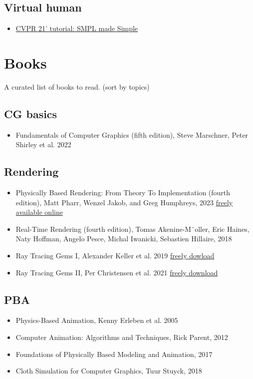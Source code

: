 \documentclass{article}
\begin{document}
\subsection{Virtual human}
\begin{itemize}
    \item \href{https://smpl-made-simple.is.tue.mpg.de/}{CVPR 21' tutorial: SMPL made Simple}
\end{itemize}


\section{Books}
\par A curated list of books to read. (sort by topics)
\subsection{CG basics}
\begin{itemize}
    \item Fundamentals of Computer Graphics (fifth edition), Steve Marschner, Peter Shirley et al. 2022
\end{itemize}
\subsection{Rendering}
\begin{itemize}
    \item Physically Based Rendering: From Theory To Implementation (fourth edition), Matt Pharr, Wenzel Jakob, and Greg Humphreys, 2023 \newline \href{https://pbr-book.org/}{freely available online}
    \item Real-Time Rendering (fourth edition), Tomas Akenine-M¨oller, Eric Haines, Naty Hoffman, Angelo Pesce, Michal Iwanicki, Sebastien Hillaire, 2018
    \item Ray Tracing Gems I, Alexander Keller et al. 2019 \newline \href{https://www.realtimerendering.com/raytracinggems/rtg/index.html}{freely dowload}
    \item Ray Tracing Gems II, Per Christensen et al. 2021 \newline \href{https://www.realtimerendering.com/raytracinggems/rtg2/index.html}{freely download}
\end{itemize}
\subsection{PBA}
\begin{itemize}
    \item Physics-Based Animation, Kenny Erleben et al. 2005
    \item Computer Animation: Algorithms and Techniques, Rick Parent, 2012
    \item Foundations of Physically Based Modeling and Animation, 2017
    \item Cloth Simulation for Computer Graphics, Tuur Stuyck, 2018
\end{itemize}
\end{document}
